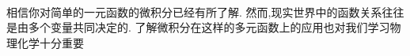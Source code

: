\documentclass{ctexart}
\begin{document}
\pagestyle{plain}
\noindent{}\vspace{15pt}\\
\indent 相信你对简单的一元函数的微积分已经有所了解.%
然而,现实世界中的函数关系往往是由多个变量共同决定的.%
了解微积分在这样的多元函数上的应用也对我们学习物理化学十分重要\vspace{12pt}\\
\end{document}
